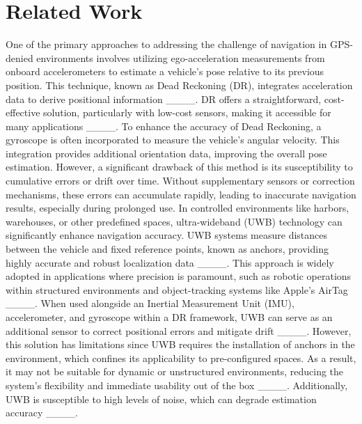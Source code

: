 \section{Related Work}
One of the primary approaches to addressing the challenge of navigation
in GPS-denied environments involves utilizing ego-acceleration measurements
from onboard accelerometers to estimate a vehicle's pose relative
to its previous position. This technique, known as Dead Reckoning
(DR), integrates acceleration data to derive positional information
____. DR offers a straightforward, cost-effective
solution, particularly with low-cost sensors, making it accessible
for many applications ____. To enhance the
accuracy of Dead Reckoning, a gyroscope is often incorporated to measure
the vehicle's angular velocity. This integration provides additional
orientation data, improving the overall pose estimation. However,
a significant drawback of this method is its susceptibility to cumulative
errors or drift over time. Without supplementary sensors or correction
mechanisms, these errors can accumulate rapidly, leading to inaccurate
navigation results, especially during prolonged use. In controlled
environments like harbors, warehouses, or other predefined spaces,
ultra-wideband (UWB) technology can significantly enhance navigation
accuracy. UWB systems measure distances between the vehicle and fixed
reference points, known as anchors, providing highly accurate and
robust localization data ____. This approach
is widely adopted in applications where precision is paramount, such
as robotic operations within structured environments and object-tracking
systems like Apple's AirTag ____. When used alongside
an Inertial Measurement Unit (IMU), accelerometer, and gyroscope within
a DR framework, UWB can serve as an additional sensor to correct positional
errors and mitigate drift ____. However,
this solution has limitations since UWB requires the installation
of anchors in the environment, which confines its applicability to
pre-configured spaces. As a result, it may not be suitable for dynamic
or unstructured environments, reducing the system's flexibility and
immediate usability out of the box ____.
Additionally, UWB is susceptible to high levels of noise, which can
degrade estimation accuracy ____.

